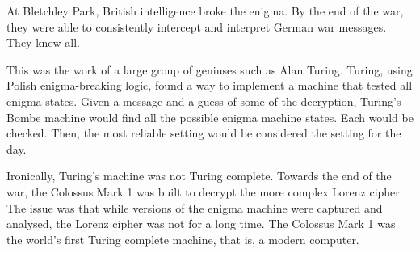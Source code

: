\documentclass[11pt]{article}
\begin{document}
At Bletchley Park, British intelligence broke the enigma. By the end of the war,
they were able to consistently intercept and interpret German war messages.
They knew all.

This was the work of a large group of geniuses such as Alan Turing. Turing,
using Polish enigma-breaking logic, found a way to implement a machine that
tested all enigma states. Given a message and a guess of some of the
decryption, Turing's Bombe machine would find all the possible enigma machine
states. Each would be checked. Then, the most reliable setting would be considered
the setting for the day.

Ironically, Turing's machine was not Turing complete. Towards the end of the war,
the Colossus Mark 1 was built to decrypt the more complex Lorenz cipher.
The issue was that while versions of the enigma machine were captured and
analysed, the Lorenz cipher was not for a long time. The Colossus Mark 1 was the
world's first Turing complete machine, that is, a modern computer.
\end{document}
